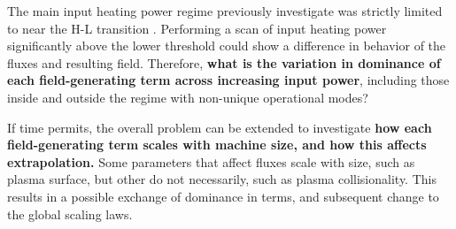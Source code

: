 \documentclass[a4paper]{article}
\begin{document}
The main input heating power regime previously investigate was strictly limited to near the H-L transition \cite{staps_backstepping_2017}.
Performing a scan of input heating power significantly above the lower threshold could show a difference in behavior of the fluxes and resulting field.
Therefore, \textbf{what is the variation in dominance of each field-generating term across increasing input power}, including those inside and outside the regime with non-unique operational modes?

If time permits, the overall problem can be extended to investigate \textbf{how each field-generating term scales with machine size, and how this affects extrapolation.}
Some parameters that affect fluxes scale with size, such as plasma surface, but other do not necessarily, such as plasma collisionality.
This results in a possible exchange of dominance in terms, and subsequent change to the global scaling laws.


\printbibliography
\end{document}

